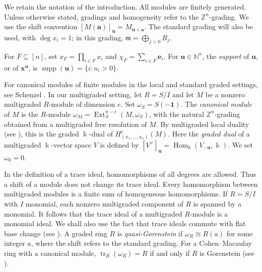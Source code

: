 \documentclass[a4paper,11pt]{amsart}
\theoremstyle{plain}
\theoremstyle{definition}
\theoremstyle{remark}
\DeclareMathOperator{\tr}{tr}
\DeclareMathOperator{\Hom}{Hom}
\DeclareMathOperator{\Ext}{Ext}
\newcommand{\kk}{\Bbbk}
\newcommand{\NN}{\mathbb N}
\newcommand{\ZZ}{\mathbb Z}
\newcommand{\ee}{\mathbf e}
\newcommand{\one}{\mathbf1}
\newcommand{\mm}{\mathfrak m}
\begin{document}
We retain the notation of the introduction. All modules are finitely generated. Unless otherwise stated, gradings and homogeneity refer to the $\ZZ^n$-grading. We use the shift convention $[M(\mathbf{a})]_{\mathbf{u}}=M_{\mathbf{u}+\mathbf{a}}$. The standard grading will also be used, with $\deg x_i=1$; in this grading, $\mm=\bigoplus_{j>0}R_j$.

For $F\subseteq[n]$, set $x_F=\prod_{i\in F}x_i$ and $\chi_F=\sum_{i\in F}\ee_i$. For $\mathbf{u}\in\NN^n$, the \emph{support} of $\mathbf{u}$, or of $\mathbf{x}^{\mathbf{u}}$, is $\operatorname{supp}(\mathbf{u})=\{i:u_i>0\}$.

For canonical modules of finite modules in the local and standard graded settings, see Schenzel \cite[Sections~1.2 and~3.3]{Sch98}. In our multigraded setting, let $R=S/I$ and let $M$ be a nonzero multigraded $R$-module of dimension $e$. Set $\omega_S=S(-\one)$. The \emph{canonical module} of $M$ is the $R$-module $\omega_M=\Ext_S^{n-e}(M,\omega_S)$, with the natural $\ZZ^n$-grading obtained from a multigraded free resolution of $M$. By multigraded local duality (see \cite[Corollary~6.1]{Mil00}), this is the graded $\kk$-dual of $H^e_{(x_1,\ldots,x_n)}(M)$. Here the \emph{graded dual} of a multigraded $\kk$-vector space $V$ is defined by $[V^\vee]_{\mathbf{u}}=\Hom_\kk(V_{-\mathbf{u}},\kk)$. We set $\omega_0=0$.

In the definition of a trace ideal, homomorphisms of all degrees are allowed. Thus a shift of a module does not change its trace ideal. Every homomorphism between multigraded modules is a finite sum of homogeneous homomorphisms. If $R=S/I$ with $I$ monomial, each nonzero multigraded component of $R$ is spanned by a monomial. It follows that the trace ideal of a multigraded $R$-module is a monomial ideal. We shall also use the fact that trace ideals commute with flat base change (see \cite[Lemma~1.5\,(iii)]{HHS}). A graded ring $R$ is \emph{quasi-Gorenstein} if $\omega_R\cong R(a)$ for some integer $a$, where the shift refers to the standard grading. For a Cohen--Macaulay ring with a canonical module, $\tr_R(\omega_R)=R$ if and only if $R$ is Gorenstein (see \cite[Lemma~2.1]{HHS}).
\end{document}

